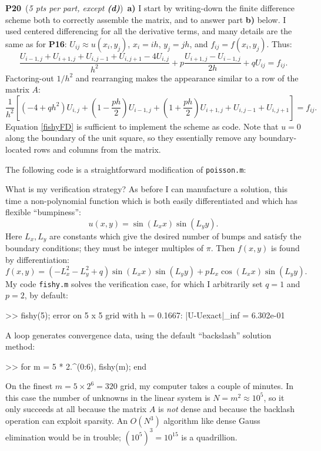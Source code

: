 \documentclass[11pt]{amsart}
\newcommand{\mfile}[2]{
\bigskip
\begin{quote}
\medskip
\VerbatimInput[frame=single,framesep=3mm,label=\fbox{\normalsize \textsl{\,#1\,}},fontfamily=courier,fontsize=\scriptsize]{#2}
\medskip
\end{quote}
}
\newcommand{\probpts}[2]{\bigskip\noindent\large \textbf{#1} \normalsize \,(\emph{#2})\,}
\newcommand{\ppart}[1]{\quad \textbf{#1)} }
\begin{document}
\probpts{P20}{5 pts per part, except \emph{\textbf{(d)}}}  \ppart{a}  I start by writing-down the finite difference scheme both to correctly assemble the matrix, and to answer part \textbf{b)} below.  I used centered differencing for all the derivative terms, and many details are the same as for \textbf{P16}: $U_{ij} \approx u(x_i,y_j)$, $x_i = i h$, $y_j = j h$, and $f_{ij} = f(x_i,y_j)$.  Thus:
\begin{equation*}
\frac{U_{i-1,j} + U_{i+1,j} + U_{i,j-1} + U_{i,j+1} - 4 U_{i,j}}{h^2} + p \frac{U_{i+1,j} - U_{i-1,j}}{2h} + q U_{ij} = f_{ij}.
\end{equation*}
Factoring-out $1/h^2$ and rearranging makes the appearance similar to a row of the matrix $A$:
\begin{equation}
\frac{1}{h^2} \left[(-4 + q h^2) U_{i,j} + \left(1 - \frac{p h}{2}\right) U_{i-1,j} + \left(1 + \frac{p h}{2}\right) U_{i+1,j} + U_{i,j-1} + U_{i,j+1}\right] = f_{ij}.
\label{fishyFD}
\end{equation}
Equation \eqref{fishyFD} is sufficient to implement the scheme as code.  Note that $u=0$ along the boundary of the unit square, so they essentially remove any boundary-located rows and columns from the matrix.

The following code is a straightforward modification of \texttt{poisson.m}:


What is my verification strategy?  As before I can manufacture a solution, this time a non-polynomial function which is both easily differentiated and which has flexible ``bumpiness'':
    $$u(x,y) = \sin(L_x x) \sin(L_y y).$$
Here $L_x,L_y$ are constants which give the desired number of bumps and satisfy the boundary conditions; they must be integer multiples of $\pi$.  Then $f(x,y)$ is found by differentiation:
    $$f(x,y) = \left(-L_x^2-L_y^2+q\right) \sin(L_x x) \sin(L_y y) + p L_x \cos(L_x x) \sin(L_y y).$$
My code \texttt{fishy.m} solves the verification case, for which I arbitrarily set $q=1$ and $p=2$, by default:
\begin{mVerb}
>> fishy(5);
error on 5 x 5 grid with h = 0.1667:  |U-Uexact|_inf = 6.302e-01
\end{mVerb}

A loop generates convergence data, using the default ``backslash'' solution method:
\begin{mVerb}
>> for m = 5 * 2.^(0:6), fishy(m); end
\end{mVerb}
On the finest $m=5 \times 2^6 = 320$ grid, my computer takes a couple of minutes.  In this case the number of unknowns in the linear system is $N=m^2\approx 10^5$, so it only succeeds at all because the matrix $A$ is \emph{not} dense and because the backlash operation can exploit sparsity.  An $O(N^3)$ algorithm like dense Gauss elimination would be in trouble; $(10^5)^3 = 10^{15}$ is a quadrillion.
\end{document}
